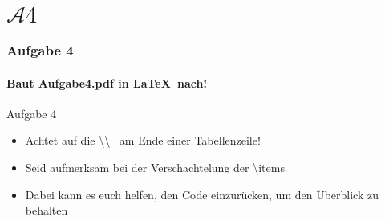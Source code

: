\section{$\mathcal{A}4$} 
\begin{frame}
\frametitle{Aufgabe 4}
\framesubtitle{Baut Aufgabe4.pdf in \LaTeX ~nach!} 

\begin{block}{Aufgabe 4}
\begin{itemize}
  \item Achtet auf die \color{nounibaredII}\textbackslash \textbackslash \color{black} \ am Ende einer Tabellenzeile!
  \item Seid aufmerksam bei der Verschachtelung der \color{nounibaredII}\textbackslash item\color{black}s
  \item Dabei kann es euch helfen, den Code einzurücken, um den Überblick zu behalten
\end{itemize}
\end{block}
\end{frame}
